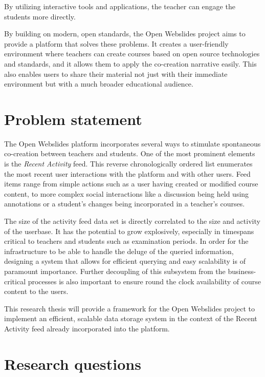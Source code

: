 By utilizing interactive tools and applications, the teacher can engage the students more directly.

By building on modern, open standards, the Open Webslides project \autocite{OpenWebslides2017} aims to provide a platform that solves these problems. It creates a user-friendly environment where teachers can create courses based on open source technologies and standards, and it allows them to apply the co-creation narrative easily. This also enables users to share their material not just with their immediate environment but with a much broader educational audience.

\section{Problem statement}
\label{sec:problem-statement}

The Open Webslides platform incorporates several ways to stimulate spontaneous co-creation between teachers and students. One of the most prominent elements is the \textit{Recent Activity} feed. This reverse chronologically ordered list enumerates the most recent user interactions with the platform and with other users. Feed items range from simple actions such as a user having created or modified course content, to more complex social interactions like a discussion being held using annotations or a student's changes being incorporated in a teacher's courses.

The size of the activity feed data set is directly correlated to the size and activity of the userbase. It has the potential to grow explosively, especially in timespans critical to teachers and students such as examination periods. In order for the infrastructure to be able to handle the deluge of the queried information, designing a system that allows for efficient querying and easy scalability is of paramount importance. Further decoupling of this subsystem from the business-critical processes is also important to ensure round the clock availability of course content to the users.

This research thesis will provide a framework for the Open Webslides project to implement an efficient, scalable data storage system in the context of the Recent Activity feed already incorporated into the platform.

\section{Research questions}
\label{sec:research-questions}

